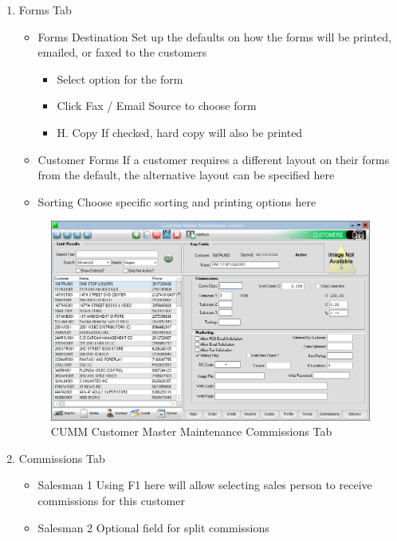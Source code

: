 \begin{enumerate}
	\item Forms Tab
	\begin{itemize}
		\item Forms Destination \textemdash Set up the defaults on how the forms will be printed, emailed, or faxed to the customers
		\begin{itemize}
			\item Select option for the form
			\item Click Fax / Email Source to choose form
			\item H. Copy \textemdash If checked, hard copy will also be printed
		\end{itemize}
		\item Customer Forms \textemdash If a customer requires a different layout on their forms from the default, the alternative layout can be specified here
		\item Sorting \textemdash Choose specific sorting and printing options here
	\end{itemize}	
	
	\begin{figure}[H]
		\includegraphics[width=\textwidth]{../img/image82}
		\caption{CUMM Customer Master Maintenance Commissions Tab}
	\end{figure}
	
	\item Commissions Tab
	\begin{itemize}
		\item Salesman 1 \textemdash Using F1 here will allow selecting sales person to receive commissions for this customer
		\item Salesman 2 \textemdash Optional field for split commissions
	\end{itemize}
\end{enumerate}

